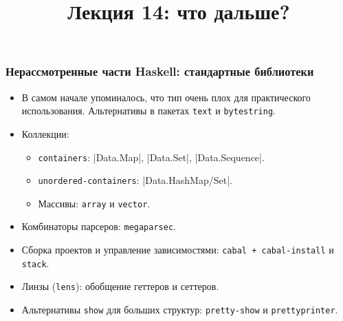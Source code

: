\documentclass[11pt]{beamer}
\title{Лекция 14: что дальше?}
\begin{document}
\begin{frame}[plain]
  \maketitle
\end{frame}

\begin{frame}[fragile]
  \frametitle{Нерассмотренные части Haskell: стандартные библиотеки}
  \begin{itemize}
    \item В самом начале упоминалось, что тип  очень плох для практического использования. Альтернативы в пакетах \lstinline|text| и \lstinline|bytestring|.
    \item Коллекции:
          \begin{itemize}
            \item \lstinline|containers|: \haskinline|Data.Map|, \haskinline|Data.Set|, \haskinline|Data.Sequence|.
            \item \lstinline|unordered-containers|: \haskinline|Data.Hash{Map/Set}|.
            \item Массивы: \lstinline|array| и \lstinline|vector|.
          \end{itemize}
    \item Комбинаторы парсеров: \lstinline|megaparsec|.
    \item Сборка проектов и управление зависимостями: \lstinline|cabal + cabal-install| и \lstinline|stack|.
    \item Линзы (\lstinline|lens|): обобщение геттеров и сеттеров.
    \item Альтернативы \lstinline|show| для больших структур: \lstinline|pretty-show| и \lstinline|prettyprinter|.
  \end{itemize}
\end{frame}
\end{document}
